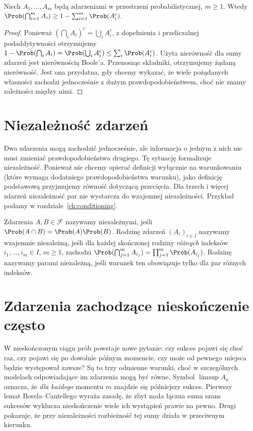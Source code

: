 \begin{stwierdzenie}
Niech $A_1,\ldots,A_m$ będą zdarzeniami w przestrzeni
probabilistycznej, $m\geq1$. Wtedy
$\Prob(\bigcap_{i=1}^m A_i)
\geq 1-\sum_{i=1}^m\Prob(A_i^c)$.
\end{stwierdzenie}
\begin{proof}
Ponieważ $(\bigcap_i A_i)^c=\bigcup_i A_i^c$,
z dopełnienia i przeliczalnej podaddytywności otrzymujemy
$1-\Prob(\bigcap_i A_i)
=\Prob(\bigcup_i A_i^c)\leq\sum_i\Prob(A_i^c)$.
Użyta nierówność dla sumy zdarzeń jest nierównością Boole'a.
Przenosząc składniki, otrzymujemy żądaną nierówność.
Jest ona przydatna, gdy chcemy wykazać, że wiele
pożądanych własności zachodzi jednocześnie z dużym
prawdopodobieństwem, choć nie znamy zależności między nimi.
\end{proof}

\section{Niezależność zdarzeń}
Dwa zdarzenia mogą zachodzić jednocześnie, ale informacja
o jednym z nich nie musi zmieniać prawdopodobieństwa drugiego.
Tę sytuację formalizuje niezależność. Ponieważ nie chcemy
opierać definicji wyłącznie na warunkowaniu (które wymaga dodatniego
prawdopodobieństwa warunku), jako definicję podstawową przyjmujemy
równość dotyczącą przecięcia. Dla trzech i więcej zdarzeń
niezależność par nie wystarcza do wzajemnej niezależności.
Przykład podamy w rozdziale~\ref{ch:conditioning}.

\begin{definicja}
Zdarzenia $A,B\in\mathcal F$ nazywamy niezależnymi, jeśli
$\Prob(A\cap B)=\Prob(A)\Prob(B)$.
Rodzinę zdarzeń $(A_i)_{i\in I}$ nazywamy wzajemnie niezależną,
jeśli dla każdej skończonej rodziny \emph{różnych} indeksów
$i_1,\ldots,i_m\in I$, $m\geq1$, zachodzi
$\Prob(\bigcap_{j=1}^m A_{i_j})=\prod_{j=1}^m\Prob(A_{i_j})$.
Rodzinę nazywamy parami niezależną, jeśli warunek ten obowiązuje
tylko dla par różnych indeksów.
\end{definicja}

\section{Zdarzenia zachodzące nieskończenie często}
W nieskończonym ciągu prób powstaje nowe pytanie: czy sukces
pojawi się choć raz, czy pojawi się po dowolnie późnym momencie,
czy może od pewnego miejsca będzie występował zawsze?
Są to trzy odmienne warunki, choć w szczególnych modelach
odpowiadające im zdarzenia mogą być równe. Symbol $\limsup A_n$ oznacza, że
\emph{dla każdego} momentu $m$ znajdzie się późniejszy sukces.
Pierwszy lemat Borela--Cantellego wyraża zasadę, że zbyt mała
łączna suma szans sukcesów wyklucza nieskończenie wiele ich
wystąpień prawie na pewno. Drugi pokazuje, że przy niezależności
rozbieżność tej sumy działa w przeciwnym kierunku.

